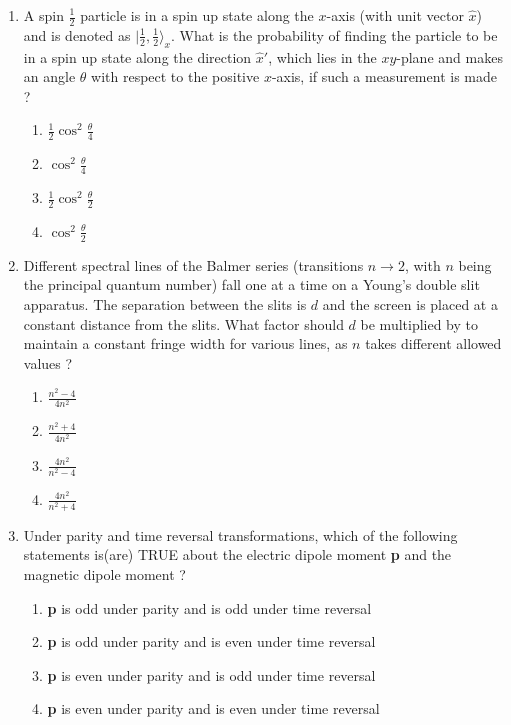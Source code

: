 \documentclass[journal]{IEEEtran}
\begin{document}
\begin{enumerate}
\item A spin $\frac{1}{2}$ particle is in a spin up state along the $x$-axis (with unit vector $\hat{x}$) and is denoted as $\bigg|\frac{1}{2},\frac{1}{2}\rangle_x$. What is the probability of finding the particle to be in a
spin up state along the direction $\hat{x}'$, which lies in the $xy$-plane and makes an angle $\theta$ with respect to the positive $x$-axis, if such a measurement is made ?
\begin{enumerate}
    \item $\frac{1}{2}\cos^2\frac{\theta}{4}$
    \item $\cos^2\frac{\theta}{4}$
    \item $\frac{1}{2}\cos^2\frac{\theta}{2}$
    \item $\cos^2\frac{\theta}{2}$ \\
\end{enumerate}
\item Different spectral lines of the Balmer series (transitions $n \rightarrow 2$, with $n$ being the principal quantum number) fall one at a time on a Young's double slit apparatus. The separation between the slits is $d$ and the screen is placed at a constant distance from the slits. What factor should $d$ be multiplied by to maintain a constant fringe width for various lines, as $n$ takes different allowed values ? 
\begin{enumerate}
    \item $\frac{n^2 - 4}{4n^2}$
    \item $\frac{n^2 + 4}{4n^2}$
    \item $\frac{4n^2}{n^2 - 4}$
    \item $\frac{4n^2}{n^2 + 4}$ \\
\end{enumerate}
\item Under parity and time reversal transformations, which of the following statements is(are) TRUE about the electric dipole moment \textbf{p} and the magnetic dipole moment \boldsymbol{$\mu$} ?  
\begin{enumerate}
    \item \textbf{p} is odd under parity and \boldsymbol{$\mu$} is odd under time reversal
    \item \textbf{p} is odd under parity and \boldsymbol{$\mu$} is even under time reversal
    \item \textbf{p} is even under parity and \boldsymbol{$\mu$} is odd under time reversal
    \item \textbf{p} is even under parity and \boldsymbol{$\mu$} is even under time reversal \\

\end{enumerate}
\end{enumerate}
\end{document}
